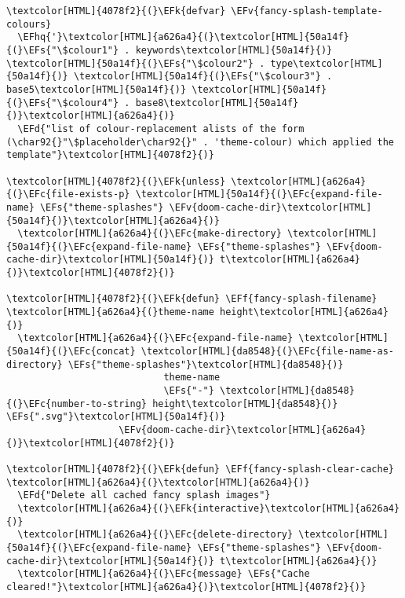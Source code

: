 \documentclass{scrartcl}
\newcommand{\EFk}[1]{\textcolor{EFk}{#1}} %
\newcommand{\EFd}[1]{\textcolor{EFd}{\textit{#1}}} %
\newcommand{\EFs}[1]{\textcolor{EFs}{#1}} %
\newcommand{\EFc}[1]{\textcolor{EFc}{#1}} %
\newcommand{\EFv}[1]{\textcolor{EFv}{#1}} %
\newcommand{\EFf}[1]{\textcolor{EFf}{#1}} %
\newcommand{\EFhq}[1]{\textcolor{EFhq}{#1}} %
\begin{document}
\begin{Code}
\begin{Verbatim}[]
\textcolor[HTML]{4078f2}{(}\EFk{defvar} \EFv{fancy-splash-template-colours}
  \EFhq{'}\textcolor[HTML]{a626a4}{(}\textcolor[HTML]{50a14f}{(}\EFs{"\$colour1"} . keywords\textcolor[HTML]{50a14f}{)} \textcolor[HTML]{50a14f}{(}\EFs{"\$colour2"} . type\textcolor[HTML]{50a14f}{)} \textcolor[HTML]{50a14f}{(}\EFs{"\$colour3"} . base5\textcolor[HTML]{50a14f}{)} \textcolor[HTML]{50a14f}{(}\EFs{"\$colour4"} . base8\textcolor[HTML]{50a14f}{)}\textcolor[HTML]{a626a4}{)}
  \EFd{"list of colour-replacement alists of the form (\char92{}"\$placeholder\char92{}" . 'theme-colour) which applied the template"}\textcolor[HTML]{4078f2}{)}

\textcolor[HTML]{4078f2}{(}\EFk{unless} \textcolor[HTML]{a626a4}{(}\EFc{file-exists-p} \textcolor[HTML]{50a14f}{(}\EFc{expand-file-name} \EFs{"theme-splashes"} \EFv{doom-cache-dir}\textcolor[HTML]{50a14f}{)}\textcolor[HTML]{a626a4}{)}
  \textcolor[HTML]{a626a4}{(}\EFc{make-directory} \textcolor[HTML]{50a14f}{(}\EFc{expand-file-name} \EFs{"theme-splashes"} \EFv{doom-cache-dir}\textcolor[HTML]{50a14f}{)} t\textcolor[HTML]{a626a4}{)}\textcolor[HTML]{4078f2}{)}

\textcolor[HTML]{4078f2}{(}\EFk{defun} \EFf{fancy-splash-filename} \textcolor[HTML]{a626a4}{(}theme-name height\textcolor[HTML]{a626a4}{)}
  \textcolor[HTML]{a626a4}{(}\EFc{expand-file-name} \textcolor[HTML]{50a14f}{(}\EFc{concat} \textcolor[HTML]{da8548}{(}\EFc{file-name-as-directory} \EFs{"theme-splashes"}\textcolor[HTML]{da8548}{)}
                            theme-name
                            \EFs{"-"} \textcolor[HTML]{da8548}{(}\EFc{number-to-string} height\textcolor[HTML]{da8548}{)} \EFs{".svg"}\textcolor[HTML]{50a14f}{)}
                    \EFv{doom-cache-dir}\textcolor[HTML]{a626a4}{)}\textcolor[HTML]{4078f2}{)}

\textcolor[HTML]{4078f2}{(}\EFk{defun} \EFf{fancy-splash-clear-cache} \textcolor[HTML]{a626a4}{(}\textcolor[HTML]{a626a4}{)}
  \EFd{"Delete all cached fancy splash images"}
  \textcolor[HTML]{a626a4}{(}\EFk{interactive}\textcolor[HTML]{a626a4}{)}
  \textcolor[HTML]{a626a4}{(}\EFc{delete-directory} \textcolor[HTML]{50a14f}{(}\EFc{expand-file-name} \EFs{"theme-splashes"} \EFv{doom-cache-dir}\textcolor[HTML]{50a14f}{)} t\textcolor[HTML]{a626a4}{)}
  \textcolor[HTML]{a626a4}{(}\EFc{message} \EFs{"Cache cleared!"}\textcolor[HTML]{a626a4}{)}\textcolor[HTML]{4078f2}{)}


\end{Verbatim}
\end{Code}
\end{document}
